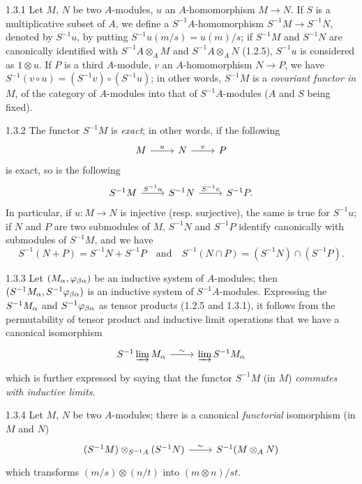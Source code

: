 \documentclass[../main.tex]{subfiles}
\begin{document}
\begin{cx}{1.3.1}
Let $M$, $N$ be two $A$-modules, $u$ an $A$-homomorphism $M\to N$. If $S$ is a multiplicative subset of $A$,
we define a $S^{-1}A$-homomorphism $S^{-1}M\to S^{-1}N$, denoted by $S^{-1}u$, by putting
$S^{-1}u(m/s)=u(m)/s$; if $S^{-1}M$ and $S^{-1}N$ are canonically identified with $S^{-1}A\otimes_A M$ and
$S^{-1}A\otimes_A N$ (1.2.5), $S^{-1}u$ is considered as $1\otimes u$. If $P$ is a third $A$-module,
$v$ an $A$-homomorphism $N\to P$, we have $S^{-1}(v\circ u)=(S^{-1}v)\circ(S^{-1}u)$; in other words,
$S^{-1}M$ is a \emph{covariant functor in} $M$, of the category of $A$-modules into that of $S^{-1}A$-modules
($A$ and $S$ being fixed).
\end{cx}

\begin{cx}{1.3.2}
The functor $S^{-1}M$ is \emph{exact}; in other words, if the following
\[\begin{tikzcd}
  M\ar[r,"u"] & N\ar[r,"v"] & P
\end{tikzcd}\]
is exact, so is the following
\[\begin{tikzcd}
  S^{-1}M\ar[r,"S^{-1}u"] & S^{-1}N\ar[r,"S^{-1}v"] & S^{-1}P.
\end{tikzcd}\]
In particular, if $u:M\to N$ is injective (resp. surjective), the same is true for $S^{-1}u$;
 if $N$ and $P$ are two
submodules of $M$, $S^{-1}N$ and $S^{-1}P$ identify canonically with submodules of $S^{-1}M$, and we have
\[
  S^{-1}(N+P)=S^{-1}N+S^{-1}P\quad\text{and}\quad S^{-1}(N\cap P)=(S^{-1}N)\cap(S^{-1}P).
\]
\end{cx}

\begin{cx}{1.3.3}
Let $(M_\alpha,\varphi_{\beta\alpha})$ be an inductive system of $A$-modules; then
$(S^{-1}M_\alpha,S^{-1}\varphi_{\beta\alpha})$ is an inductive system of $S^{-1}A$-modules.
Expressing the $S^{-1}M_\alpha$ and $S^{-1}\varphi_{\beta\alpha}$ as tensor products (1.2.5 and 1.3.1),
it follows from the permutability of tensor product and inductive limit operations that we have a canonical isomorphism
\[\begin{tikzcd}
  S^{-1}\varinjlim M_\a\ar[r,"\sim"] &\varinjlim S^{-1} M_\a
\end{tikzcd}\]
which is further expressed by saying that the functor $S^{-1}M$ (in $M$) \emph{commutes with inductive limits}.
\end{cx}

\begin{cx}{1.3.4}
Let $M$, $N$ be two $A$-modules; there is a canonical \emph{functorial} isomorphism (in $M$ and $N$)
\[\begin{tikzcd}
  (S^{-1}M)\otimes_{S^{-1}A}(S^{-1}N)\ar[r,"\sim"] &S^{-1}(M\otimes_A N)
\end{tikzcd}\]
which transforms $(m/s)\otimes(n/t)$ into $(m\otimes n)/st$.
\end{cx}
\end{document}
